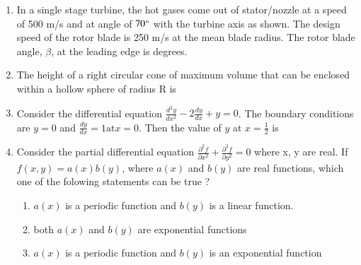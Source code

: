 \documentclass[journal]{IEEEtran}
\begin{document}
\begin{enumerate}
	\item In a single stage turbine, the hot gases come out of stator/nozzle at a speed of 500 m/s and at angle of $70 \degree$ with the turbine axis as shown. The design speed of the rotor blade is 250 m/s at the mean blade radius. The rotor blade angle, $\beta$, at the leading edge is \underline{  } degrees.
		\begin{figure}[H]
						\centering
						
					\end{figure}
	\item The height of a right  circular cone of maximum volume that can be enclosed within a hollow sphere of radius R is
		\begin{enumerate}
		\end{enumerate}
	\item Consider the differential equation $\frac{d^2 y}{d x^2} - 2 \frac{dy}{dx} + y = 0$. The boundary conditions are $y=0$ and $\frac{dy}{dx} = 1 \text{at} x=0$. Then the value of $y$ at $x = \frac{1}{2}$ is
		\begin{enumerate}
				\begin{multicols}{4}
				\item 0
				\item $\sqrt{e}$
				\item $\frac{\sqrt{e}}{2}$
				\item $\sqrt{\frac{e}{2}}$
				\end{multicols}
		\end{enumerate}
	\item Consider the partial differential equation $\frac{\partial ^2 f}{\partial x^2} + \frac{\partial ^2 f}{\partial y^2} = 0$ where x, y are real. If $f(x,y) = a(x) b(y) $, where $a(x)$ and $b(y)$ are real functions, which one of the folowing statements can be true ?
		\begin{enumerate}
			\item $a(x)$ is a periodic function and $b(y)$ is a linear function.
			\item both $a(x)$ and $b(y)$ are exponential functions
			\item $a(x)$ is a periodic function and $b(y)$ is an exponential function

\end{enumerate}
\end{enumerate}
\end{document}

